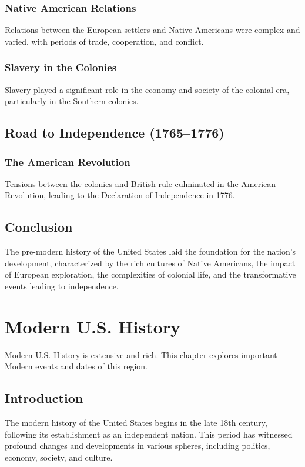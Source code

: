 \documentclass{book}
\begin{document}
\subsection{Native American Relations}
\label{subsec:native-american-relations}
Relations between the European settlers and Native Americans were complex and varied, with periods of trade, cooperation, and conflict.

\subsection{Slavery in the Colonies}
\label{subsec:slavery-colonies}
Slavery played a significant role in the economy and society of the colonial era, particularly in the Southern colonies.

\section{Road to Independence (1765–1776)}
\label{sec:road-independence}
\subsection{The American Revolution}
\label{subsec:american-revolution}
Tensions between the colonies and British rule culminated in the American Revolution, leading to the Declaration of Independence in 1776.

\section{Conclusion}
\label{sec:conclusion-pre-modern-usa}
The pre-modern history of the United States laid the foundation for the nation’s development, characterized by the rich cultures of Native Americans, the impact of European exploration, the complexities of colonial life, and the transformative events leading to independence.

\chapter{Modern U.S. History}
\label{ch:modern-us-history}

Modern U.S. History is extensive and rich. This chapter explores important Modern events and dates of this region.

\section{Introduction}
\label{sec:introduction-modern-usa}
The modern history of the United States begins in the late 18th century, following its establishment as an independent nation. This period has witnessed profound changes and developments in various spheres, including politics, economy, society, and culture.
\end{document}
